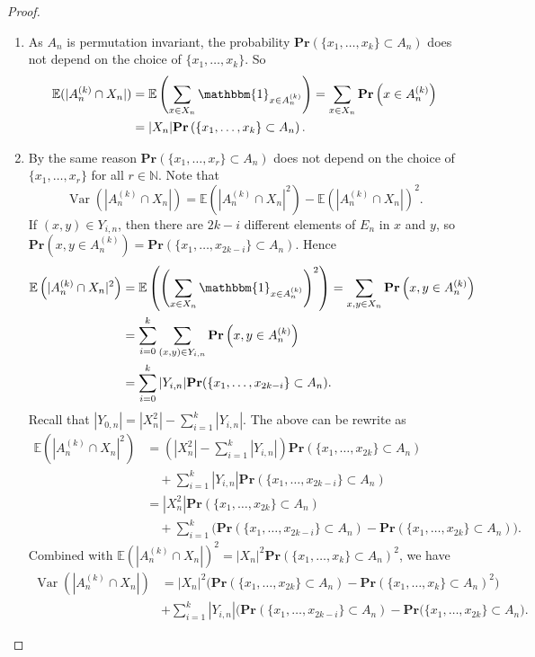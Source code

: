 \documentclass{article}
\DeclareMathOperator{\Var}{Var}
\def\Pr{\mathbf{Pr}}
\newcommand\esp[1]{\mathbb{E}\left( #1 \right)}
\theoremstyle{remark}
\begin{document}
\begin{proof}\quad
    \begin{enumerate}
        \item As $A_n$ is permutation invariant, the probability $\Pr(\{x_1,\dots,x_k\}\subset A_n)$ does not depend on the choice of $\{x_1,\dots,x_k\}$. So
        \[\begin{split} \mathbb{E}(|A_n^{(k)} \cap X_n|)& =  \mathbb{E}\left(\sum_{x\in X_n}\mathbbm{1}_{x\in A_n^{(k)}}\right) = \sum_{x\in X_n}\Pr\left(x\in A_n^{(k)}\right)\\
        & = |X_n|\Pr\left(\{x_1,\dots,x_k\}\subset A_n\right).
        \end{split}\]
        \item By the same reason $\Pr(\{x_1,\dots,x_r\}\subset A_n)$ does not depend on the choice of $\{x_1,\dots,x_r\}$ for all $r\in\mathbb{N}$. Note that 
        \[\Var(|A_n^{(k)} \cap X_n|) = \esp{|A_n^{(k)} \cap X_n|^2} - \esp{|A_n^{(k)} \cap X_n|}^2.\] 
        If $(x,y) \in Y_{i,n}$, then there are $2k-i$ different elements of $E_n$ in $x$ and $y$, so $\Pr\left(x,y\in A_n^{(k)}\right) = \Pr(\{x_1,\dots,x_{2k-i}\}\subset A_n)$. Hence
        \begin{align*} \esp{|A_n^{(k)} \cap X_n|^2} & = \esp{\left(\sum_{x\in X_n}\mathbbm{1}_{x\in A_n^{(k)}}\right)^2} = \sum_{x,y\in X_n}\Pr\left(x,y\in A_n^{(k)}\right)\\
        & =  \sum_{i = 0}^{k}\sum_{(x,y)\in Y_{i,n}}\Pr\left(x,y\in A_n^{(k)}\right)\\
        & =  \sum_{i = 0}^{k}|Y_{i,n}|\Pr(\{x_1,\dots,x_{2k-i}\}\subset A_n).\end{align*}
        Recall that $|Y_{0,n}| = |X_n^2| - \sum_{i=1}^k|Y_{i,n}|$. The above can be rewrite as
        \begin{align*}
        \esp{|A_n^{(k)} \cap X_n|^2} & = \left(|X_n^2| - \sum_{i = 1}^{k}|Y_{i,n}|\right) \Pr(\{x_1,\dots,x_{2k}\}\subset A_n)\\
        & \quad + \sum_{i = 1}^{k}|Y_{i,n}| \Pr(\{x_1,\dots,x_{2k-i}\}\subset A_n)\\
        & = |X_n^2|\Pr(\{x_1,\dots,x_{2k}\}\subset A_n)\\
        & \quad + \sum_{i=1}^k\Big(\Pr(\{x_1,\dots,x_{2k-i}\}\subset A_n)-\Pr(\{x_1,\dots,x_{2k}\}\subset A_n)\Big).
        \end{align*}
        Combined with $\esp{|A_n^{(k)} \cap X_n|}^2 = |X_n|^2\Pr\left(\{x_1,\dots,x_k\}\subset A_n\right)^2$, we have
        \begin{align*} \Var(|A_n^{(k)} \cap X_n|) & =  |X_n|^2\Big(\Pr(\{x_1,\dots,x_{2k}\}\subset A_n) - \Pr(\{x_1,\dots,x_{k}\}\subset A_n)^2 \Big) \\
        & + \sum_{i = 1}^{k}|Y_{i,n}| \Big(\Pr(\{x_1,\dots,x_{2k-i}\}\subset A_n) - \Pr(\{x_1,\dots,x_{2k}\}\subset A_n\Big).
        \end{align*}
    \end{enumerate}
\end{proof}
\end{document}
